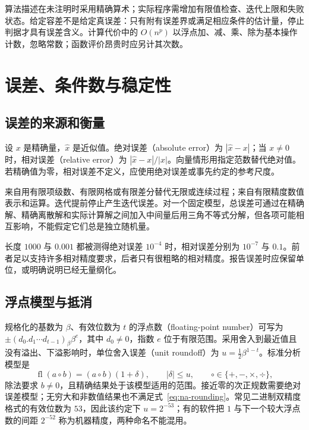 \documentclass[UTF8,12pt,a4paper,fontset=fandol]{ctexbook}
\begin{document}
算法描述在未注明时采用精确算术；实际程序需增加有限值检查、迭代上限和失败状态。给定容差不是给定真误差：只有附有误差界或满足相应条件的估计量，停止判据才具有误差含义。计算代价中的 $O(n^p)$ 以浮点加、减、乘、除为基本操作计数，忽略常数；函数评价昂贵时应另计其次数。

\chapter{误差、条件数与稳定性}
\label{chap:na-errors}

\section{误差的来源和衡量}
\begin{definition}[绝对误差与相对误差]
设 $x$ 是精确量，$\widehat x$ 是近似值。绝对误差（absolute error）为 $|\widehat x-x|$；当 $x\ne0$ 时，相对误差（relative error）为 $|\widehat x-x|/|x|$。向量情形用指定范数替代绝对值。若精确值为零，相对误差不定义，应使用绝对误差或事先约定的参考尺度。
\end{definition}

来自用有限项级数、有限网格或有限差分替代无限或连续过程；来自有限精度数值表示和运算。迭代提前停止产生迭代误差。对一个固定模型，总误差可通过在精确解、精确离散解和实际计算解之间加入中间量后用三角不等式分解，但各项可能相互影响，不能假定它们总是独立随机量。

\begin{example}[相同绝对误差的不同含义]
长度 $1000$ 与 $0.001$ 都被测得绝对误差 $10^{-4}$ 时，相对误差分别为 $10^{-7}$ 与 $0.1$。前者足以支持许多相对精度要求，后者只有很粗略的相对精度。报告误差时应保留单位，或明确说明已经无量纲化。
\end{example}

\section{浮点模型与抵消}
\label{sec:na-floating}
规格化的基数为 $\beta$、有效位数为 $t$ 的浮点数（floating-point number）可写为 $\pm(d_0.d_1\cdots d_{t-1})_\beta\beta^e$，其中 $d_0\ne0$，指数 $e$ 位于有限范围。采用舍入到最近值且没有溢出、下溢影响时，单位舍入误差（unit roundoff）为 $u=\tfrac12\beta^{1-t}$。标准分析模型是
\begin{equation}
 \operatorname{fl}(a\circ b)=(a\circ b)(1+\delta),
 \qquad |\delta|\le u,\qquad \circ\in\{+,-,\times,\div\},
 \label{eq:na-rounding}
\end{equation}
除法要求 $b\ne0$，且精确结果处于该模型适用的范围。接近零的次正规数需要绝对误差模型；无穷大和非数值结果也不满足式~\eqref{eq:na-rounding}。常见二进制双精度格式的有效位数为 $53$，因此该约定下 $u=2^{-53}$；有的软件把 $1$ 与下一个较大浮点数的间距 $2^{-52}$ 称为机器精度，两种命名不能混用。
\end{document}
